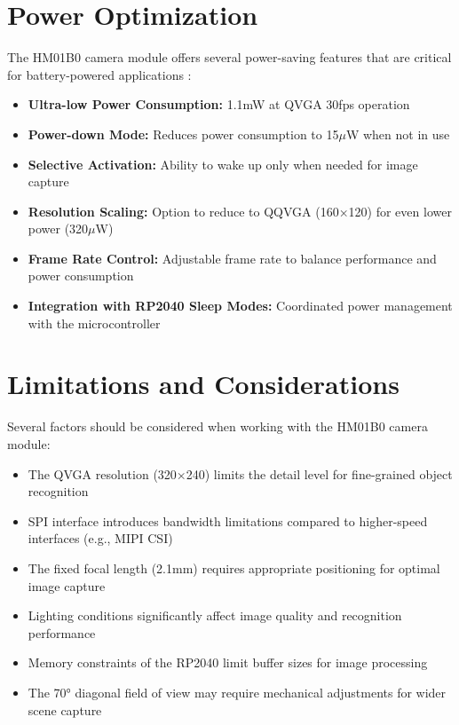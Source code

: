 \section{Power Optimization}
The HM01B0 camera module offers several power-saving features that are critical for battery-powered applications \cite{Himax:2019}:
\begin{itemize}
	\item \textbf{Ultra-low Power Consumption:} 1.1mW at QVGA 30fps operation
	\item \textbf{Power-down Mode:} Reduces power consumption to 15$\mu$W when not in use
	\item \textbf{Selective Activation:} Ability to wake up only when needed for image capture
	\item \textbf{Resolution Scaling:} Option to reduce to QQVGA (160×120) for even lower power (320$\mu$W)
	\item \textbf{Frame Rate Control:} Adjustable frame rate to balance performance and power consumption
	\item \textbf{Integration with RP2040 Sleep Modes:} Coordinated power management with the microcontroller
\end{itemize}

\section{Limitations and Considerations}
Several factors should be considered when working with the HM01B0 camera module:
\begin{itemize}
	\item The QVGA resolution (320×240) limits the detail level for fine-grained object recognition
	\item SPI interface introduces bandwidth limitations compared to higher-speed interfaces (e.g., MIPI CSI)
	\item The fixed focal length (2.1mm) requires appropriate positioning for optimal image capture
	\item Lighting conditions significantly affect image quality and recognition performance
	\item Memory constraints of the RP2040 limit buffer sizes for image processing
	\item The 70° diagonal field of view may require mechanical adjustments for wider scene capture
\end{itemize}

